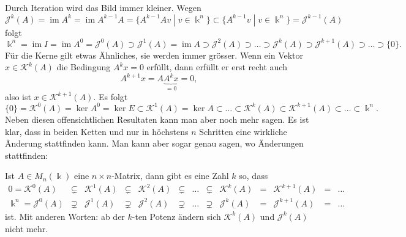 Durch Iteration wird das Bild immer kleiner.
Wegen
\[
\mathcal{J}^k (A)
=
\operatorname{im} A^k
=
\operatorname{im} A^{k-1} A
=
\{ A^{k-1} Av\;|\; v \in \Bbbk^n\}
\subset
\{ A^{k-1} v\;|\; v \in \Bbbk^n\}
=
\mathcal{J}^{k-1}(A)
\]
folgt
\begin{equation}
\Bbbk^n
=
\operatorname{im}I
=
\operatorname{im}A^0
=
\mathcal{J}^0(A)
\supset
\mathcal{J}^1(A)
=
\operatorname{im}A
\supset
\mathcal{J}^2(A)
\supset\dots\supset
\mathcal{J}^k(A)
\supset
\mathcal{J}^{k+1}(A)
\supset \dots \supset
\{0\}.
\label{buch:eigenwerte:eqn:Jkchain}
\end{equation}
Für die Kerne gilt etwas Ähnliches, sie werden immer grösser.
Wenn ein Vektor $x\in \mathcal{K}^k(A)$ die Bedingung $A^kx=0$ erfüllt,
dann erfüllt er erst recht auch
\[
A^{k+1}x=A\underbrace{A^kx}_{\displaystyle=0}=0,
\]
also ist $x\in\mathcal{K}^{k+1}(A)$.
Es folgt
\begin{equation}
\{0\}
=
\mathcal{K}^0(A) = \ker A^0 = \ker E
\subset
\mathcal{K}^1(A) = \ker A
\subset
\dots
\subset
\mathcal{K}^k(A)
\subset
\mathcal{K}^{k+1}(A)
\subset
\dots
\subset
\Bbbk^n.
\label{buch:eigenwerte:eqn:Kkchain}
\end{equation}
Neben diesen offensichtlichen Resultaten kann man aber noch mehr
sagen.
Es ist klar, dass in beiden Ketten
\label{buch:eigenwerte:eqn:Jkchain}
und
\label{buch:eigenwerte:eqn:Kkchain}
nur in höchstens $n$ Schritten eine wirkliche Änderung stattfinden 
kann.
Man kann aber sogar genau sagen, wo Änderungen stattfinden:

\begin{satz}
\label{buch:eigenwerte:satz:ketten}
Ist $A\in M_n(\Bbbk)$ eine $n\times n$-Matrix, dann gibt es eine Zahl $k$
so, dass
\[
\begin{array}{rcccccccccccl}
0=\mathcal{K}^0(A)
&\subsetneq& \mathcal{K}^1(A) &\subsetneq& \mathcal{K}^2(A)
&\subsetneq&\dots&\subsetneq&
\mathcal{K}^k(A) &=& \mathcal{K}^{k+1}(A) &=& \dots
\\
\Bbbk^n= \mathcal{J}^0(A)
&\supsetneq& \mathcal{J}^1(A) &\supsetneq& \mathcal{J}^2(A)
&\supsetneq&\dots&\supsetneq&
\mathcal{J}^k(A) &=& \mathcal{J}^{k+1}(A) &=& \dots
\end{array}
\]
ist.
Mit anderen Worten: ab der $k$-ten Potenz ändern sich
$\mathcal{K}^k(A)$ und $\mathcal{J}^k(A)$ nicht mehr.
\end{satz}

